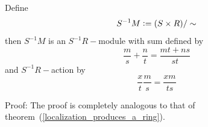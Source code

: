 \begin{dang}
    \begin{theorem}\cite{rowen2008graduate}
        Define 
        \begin{equation}
            S^{-1}M\bydef(S\times R)/\sim
        \end{equation}
        then $S^{-1}M$ is an $S^{-1}R-$module with sum defined by
        \begin{equation}
            \frac{m}{s}+\frac{n}{t} = \frac{mt+ns}{st}
        \end{equation}
        and $S^{-1}R-$action by
        \begin{equation}
            \frac{x}{t}\frac{m}{s}=\frac{xm}{ts}
        \end{equation}
    \end{theorem}
\end{dang}
Proof: The proof is completely analogous to that of theorem~(\ref{localization_produces_a_ring}).
